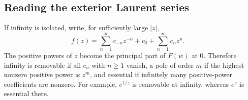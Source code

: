\documentclass[11pt,a4paper]{article}
\theoremstyle{definition}
\theoremstyle{plain}
\begin{document}
\subsection{Reading the exterior Laurent series}
If infinity is isolated, write, for sufficiently large $|z|$,
\begin{equation}\label{eq:32}
f(z)=\sum_{n=1}^{\infty}c_{-n}z^{-n}
              +c_0+\sum_{n=1}^{\infty}c_nz^n.
\end{equation}
The positive powers of $z$ become the principal part of $F(w)$ at $0$.
Therefore infinity is removable if all $c_n$ with $n\geq1$ vanish,
a pole of order $m$ if the highest nonzero positive power is $z^m$,
and essential if infinitely many positive-power coefficients are nonzero.
For example, $e^{1/z}$ is removable at infinity, whereas $e^z$ is
essential there.
\end{document}

